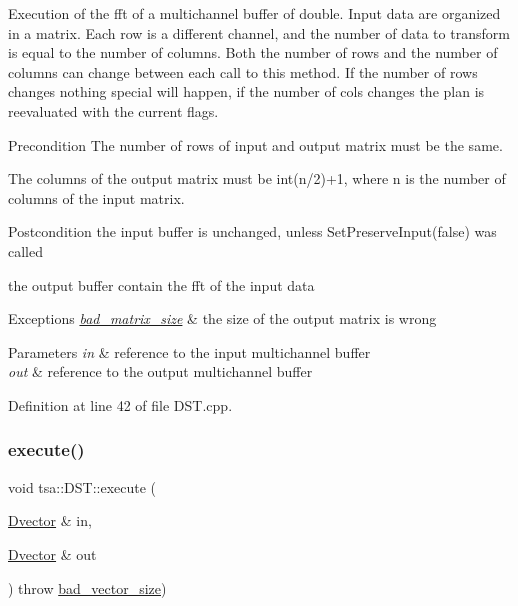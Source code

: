 Execution of the fft of a multichannel buffer of double. Input data are organized in a matrix. Each row is a different channel, and the number of data to transform is equal to the number of columns. Both the number of rows and the number of columns can change between each call to this method. If the number of rows changes nothing special will happen, if the number of cols changes the plan is reevaluated with the current flags.

\begin{DoxyPrecond}{Precondition}
The number of rows of input and output matrix must be the same. 

The columns of the output matrix must be int(n/2)+1, where n is the number of columns of the input matrix.
\end{DoxyPrecond}
\begin{DoxyPostcond}{Postcondition}
the input buffer is unchanged, unless Set\+Preserve\+Input(false) was called 

the output buffer contain the fft of the input data
\end{DoxyPostcond}

\begin{DoxyExceptions}{Exceptions}
{\em \hyperlink{classtsa_1_1bad__matrix__size}{bad\+\_\+matrix\+\_\+size}} & the size of the output matrix is wrong \\
\hline
\end{DoxyExceptions}

\begin{DoxyParams}{Parameters}
{\em in} & reference to the input multichannel buffer \\
\hline
{\em out} & reference to the output multichannel buffer \\
\hline
\end{DoxyParams}


Definition at line 42 of file D\+S\+T.\+cpp.

\mbox{\label{classtsa_1_1_d_s_t_a90170687661872523f06360cae3965ff}} 
\subsubsection{\texorpdfstring{execute()}{execute()}\hspace{0.1cm}{\footnotesize\ttfamily [2/2]}}
{\footnotesize\ttfamily void tsa\+::\+D\+S\+T\+::execute (\begin{DoxyParamCaption}\item[{\hyperlink{namespacetsa_a8900fb03d849baf447a1a0efe2561fb2}{Dvector} \&}]{in,  }\item[{\hyperlink{namespacetsa_a8900fb03d849baf447a1a0efe2561fb2}{Dvector} \&}]{out }\end{DoxyParamCaption}) throw  \hyperlink{classtsa_1_1bad__vector__size}{bad\+\_\+vector\+\_\+size}) }

